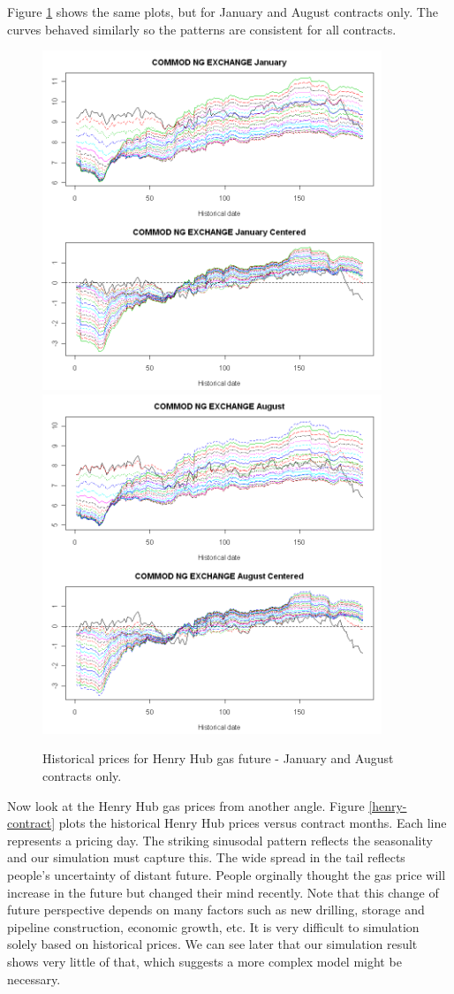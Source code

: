 Figure \ref{henry-hist-mon} 
shows the same plots, but for January and August contracts only.
The curves behaved similarly so the patterns are consistent
for all contracts. 
\begin{figure}[htbp]
\centering
\includegraphics[width=4in, height=4in]{figures/henry02.png}
\includegraphics[width=4in, height=4in]{figures/henry03.png}
\caption{Historical prices for Henry Hub gas future - January
and August contracts only.}
\label{henry-hist-mon}
\end{figure}


Now look at the Henry Hub gas prices from another angle.
Figure \ref{henry-contract} plots the historical Henry Hub prices 
versus contract months. Each line represents a pricing day. 
The striking sinusodal pattern reflects the seasonality
and our simulation must capture this. The wide spread in the tail
reflects people's uncertainty of distant future. 
People orginally thought the gas price will increase 
in the future but changed their mind recently. Note that 
this change of future perspective depends on many 
factors such as new drilling, 
storage and pipeline construction, economic growth, etc.
It is very difficult to simulation solely based on 
historical prices. We can see later that our simulation
result shows very little of that, which suggests 
a more complex model might be necessary.

